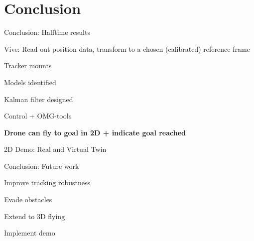 \section{Conclusion}
\label{sec:Fut_w}

\begin{frame}{Conclusion: Halftime results}

    
        \bit[label=\raisebox{0.25ex}{\tiny$\bullet$}]
            \item Vive: Read out position data, transform to a chosen (calibrated) reference frame
            \vspace{2mm}
            \item Tracker mounts
            \vspace{2mm}

            \item Models identified
            \vspace{2mm}
            \item Kalman filter designed
            \vspace{2mm}
            \item Control + OMG-tools
            \vspace{2mm}
            \item \textbf{Drone can fly to goal in 2D + indicate goal reached}
        \eit

    		
\end{frame}

\begin{frame}{2D Demo: Real and Virtual Twin}
    \centering
\end{frame}

\begin{frame}{Conclusion: Future work}

        \bit[label=\raisebox{0.25ex}{\tiny$\bullet$}]
    		\item Improve tracking robustness
    		\vspace{5mm}
    		\item Evade obstacles 
    		\vspace{5mm}
    		\item Extend to 3D flying
    		\vspace{5mm}
    		\item Implement demo
        \eit
\end{frame}

